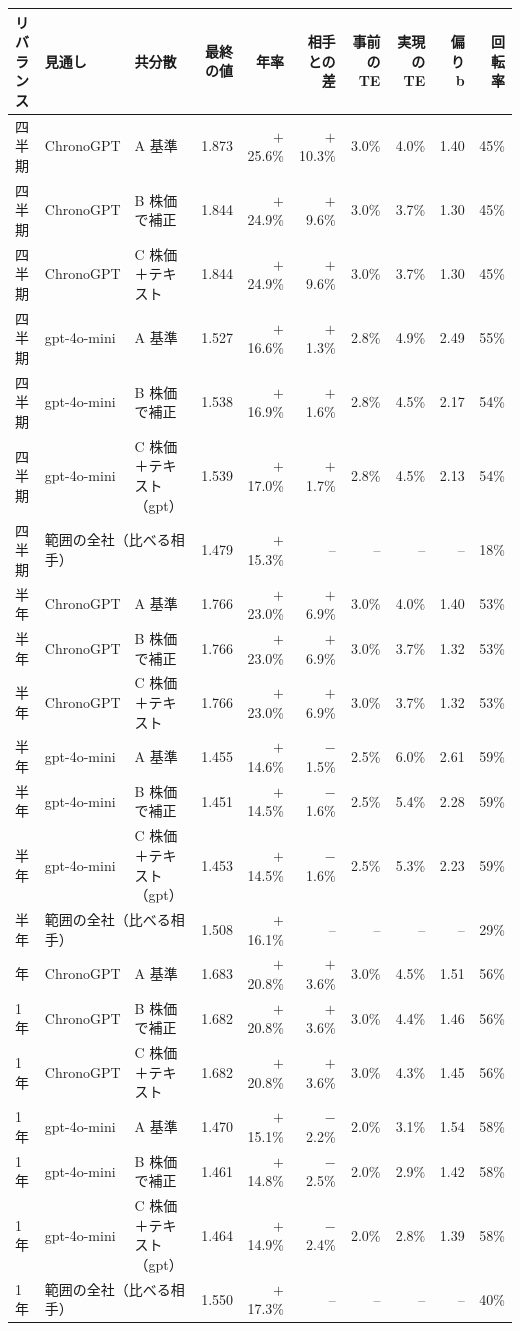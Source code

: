 \begin{tabular}{@{}lllrrrrrrr@{}}
\toprule
リバランス & 見通し & 共分散 & 最終の値 & 年率 & 相手との差 & 事前の TE & 実現の TE & 偏り b & 回転率 \\
\midrule
四半期 & ChronoGPT & A 基準 & 1.873 & $+$25.6\% & $+$10.3\% & 3.0\% & 4.0\% & 1.40 & 45\% \\
四半期 & ChronoGPT & B 株価で補正 & 1.844 & $+$24.9\% & $+$9.6\% & 3.0\% & 3.7\% & 1.30 & 45\% \\
四半期 & ChronoGPT & C 株価＋テキスト & 1.844 & $+$24.9\% & $+$9.6\% & 3.0\% & 3.7\% & 1.30 & 45\% \\
四半期 & gpt-4o-mini & A 基準 & 1.527 & $+$16.6\% & $+$1.3\% & 2.8\% & 4.9\% & 2.49 & 55\% \\
四半期 & gpt-4o-mini & B 株価で補正 & 1.538 & $+$16.9\% & $+$1.6\% & 2.8\% & 4.5\% & 2.17 & 54\% \\
四半期 & gpt-4o-mini & C 株価＋テキスト（gpt） & 1.539 & $+$17.0\% & $+$1.7\% & 2.8\% & 4.5\% & 2.13 & 54\% \\
四半期 & \multicolumn{2}{l}{範囲の全社（比べる相手）} & 1.479 & $+$15.3\% & -- & -- & -- & -- & 18\% \\
\addlinespace
半年 & ChronoGPT & A 基準 & 1.766 & $+$23.0\% & $+$6.9\% & 3.0\% & 4.0\% & 1.40 & 53\% \\
半年 & ChronoGPT & B 株価で補正 & 1.766 & $+$23.0\% & $+$6.9\% & 3.0\% & 3.7\% & 1.32 & 53\% \\
半年 & ChronoGPT & C 株価＋テキスト & 1.766 & $+$23.0\% & $+$6.9\% & 3.0\% & 3.7\% & 1.32 & 53\% \\
半年 & gpt-4o-mini & A 基準 & 1.455 & $+$14.6\% & $-$1.5\% & 2.5\% & 6.0\% & 2.61 & 59\% \\
半年 & gpt-4o-mini & B 株価で補正 & 1.451 & $+$14.5\% & $-$1.6\% & 2.5\% & 5.4\% & 2.28 & 59\% \\
半年 & gpt-4o-mini & C 株価＋テキスト（gpt） & 1.453 & $+$14.5\% & $-$1.6\% & 2.5\% & 5.3\% & 2.23 & 59\% \\
半年 & \multicolumn{2}{l}{範囲の全社（比べる相手）} & 1.508 & $+$16.1\% & -- & -- & -- & -- & 29\% \\
\addlinespace
1 年 & ChronoGPT & A 基準 & 1.683 & $+$20.8\% & $+$3.6\% & 3.0\% & 4.5\% & 1.51 & 56\% \\
1 年 & ChronoGPT & B 株価で補正 & 1.682 & $+$20.8\% & $+$3.6\% & 3.0\% & 4.4\% & 1.46 & 56\% \\
1 年 & ChronoGPT & C 株価＋テキスト & 1.682 & $+$20.8\% & $+$3.6\% & 3.0\% & 4.3\% & 1.45 & 56\% \\
1 年 & gpt-4o-mini & A 基準 & 1.470 & $+$15.1\% & $-$2.2\% & 2.0\% & 3.1\% & 1.54 & 58\% \\
1 年 & gpt-4o-mini & B 株価で補正 & 1.461 & $+$14.8\% & $-$2.5\% & 2.0\% & 2.9\% & 1.42 & 58\% \\
1 年 & gpt-4o-mini & C 株価＋テキスト（gpt） & 1.464 & $+$14.9\% & $-$2.4\% & 2.0\% & 2.8\% & 1.39 & 58\% \\
1 年 & \multicolumn{2}{l}{範囲の全社（比べる相手）} & 1.550 & $+$17.3\% & -- & -- & -- & -- & 40\% \\
\bottomrule
\end{tabular}
